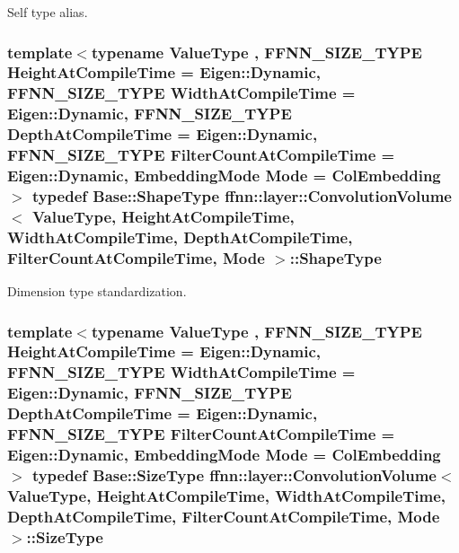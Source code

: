 Self type alias. 

\hypertarget{classffnn_1_1layer_1_1_convolution_volume_ae31080a107422dcfaff38eafadd69494}{
\subsubsection[{Shape\-Type}]{\setlength{\rightskip}{0pt plus 5cm}template$<$typename Value\-Type , F\-F\-N\-N\-\_\-\-S\-I\-Z\-E\-\_\-\-T\-Y\-P\-E Height\-At\-Compile\-Time = Eigen\-::\-Dynamic, F\-F\-N\-N\-\_\-\-S\-I\-Z\-E\-\_\-\-T\-Y\-P\-E Width\-At\-Compile\-Time = Eigen\-::\-Dynamic, F\-F\-N\-N\-\_\-\-S\-I\-Z\-E\-\_\-\-T\-Y\-P\-E Depth\-At\-Compile\-Time = Eigen\-::\-Dynamic, F\-F\-N\-N\-\_\-\-S\-I\-Z\-E\-\_\-\-T\-Y\-P\-E Filter\-Count\-At\-Compile\-Time = Eigen\-::\-Dynamic, Embedding\-Mode Mode = Col\-Embedding$>$ typedef {\bf Base\-::\-Shape\-Type} {\bf ffnn\-::layer\-::\-Convolution\-Volume}$<$ Value\-Type, Height\-At\-Compile\-Time, Width\-At\-Compile\-Time, Depth\-At\-Compile\-Time, Filter\-Count\-At\-Compile\-Time, Mode $>$\-::{\bf Shape\-Type}}}\label{classffnn_1_1layer_1_1_convolution_volume_ae31080a107422dcfaff38eafadd69494}


Dimension type standardization. 

\hypertarget{classffnn_1_1layer_1_1_convolution_volume_abddc276f0405f5c0d70de3e43c2824d9}{
\subsubsection[{Size\-Type}]{\setlength{\rightskip}{0pt plus 5cm}template$<$typename Value\-Type , F\-F\-N\-N\-\_\-\-S\-I\-Z\-E\-\_\-\-T\-Y\-P\-E Height\-At\-Compile\-Time = Eigen\-::\-Dynamic, F\-F\-N\-N\-\_\-\-S\-I\-Z\-E\-\_\-\-T\-Y\-P\-E Width\-At\-Compile\-Time = Eigen\-::\-Dynamic, F\-F\-N\-N\-\_\-\-S\-I\-Z\-E\-\_\-\-T\-Y\-P\-E Depth\-At\-Compile\-Time = Eigen\-::\-Dynamic, F\-F\-N\-N\-\_\-\-S\-I\-Z\-E\-\_\-\-T\-Y\-P\-E Filter\-Count\-At\-Compile\-Time = Eigen\-::\-Dynamic, Embedding\-Mode Mode = Col\-Embedding$>$ typedef {\bf Base\-::\-Size\-Type} {\bf ffnn\-::layer\-::\-Convolution\-Volume}$<$ Value\-Type, Height\-At\-Compile\-Time, Width\-At\-Compile\-Time, Depth\-At\-Compile\-Time, Filter\-Count\-At\-Compile\-Time, Mode $>$\-::{\bf Size\-Type}}}\label{classffnn_1_1layer_1_1_convolution_volume_abddc276f0405f5c0d70de3e43c2824d9}


